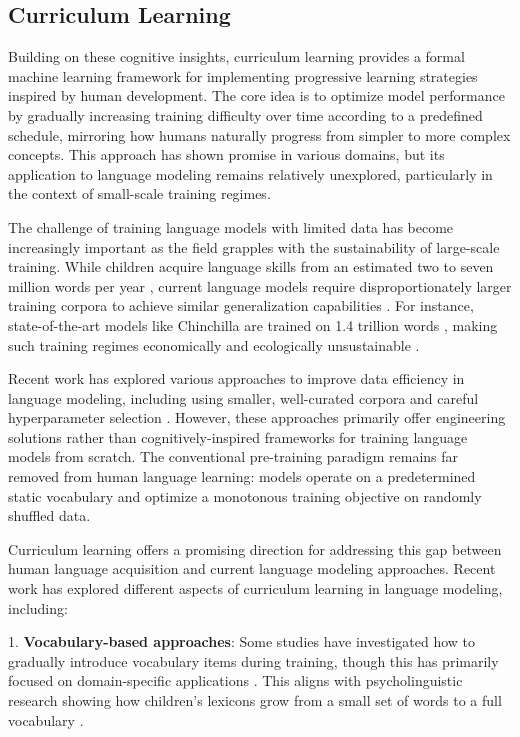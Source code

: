 \subsection{Curriculum Learning}

Building on these cognitive insights, curriculum learning \cite{bengio2009curriculum} provides a formal machine learning framework for implementing progressive learning strategies inspired by human development. The core idea is to optimize model performance by gradually increasing training difficulty over time according to a predefined schedule, mirroring how humans naturally progress from simpler to more complex concepts. This approach has shown promise in various domains, but its application to language modeling remains relatively unexplored, particularly in the context of small-scale training regimes.

The challenge of training language models with limited data has become increasingly important as the field grapples with the sustainability of large-scale training. While children acquire language skills from an estimated two to seven million words per year \cite{gilkerson2017mapping}, current language models require disproportionately larger training corpora to achieve similar generalization capabilities \cite{zhang2021need}. For instance, state-of-the-art models like Chinchilla are trained on 1.4 trillion words \cite{hoffman2022chinchilla}, making such training regimes economically and ecologically unsustainable \cite{izsak2021train}.

Recent work has explored various approaches to improve data efficiency in language modeling, including using smaller, well-curated corpora \cite{samuel2023ltgbert, gao2020pile} and careful hyperparameter selection \cite{geiping2023cramming}. However, these approaches primarily offer engineering solutions rather than cognitively-inspired frameworks for training language models from scratch. The conventional pre-training paradigm remains far removed from human language learning: models operate on a predetermined static vocabulary and optimize a monotonous training objective on randomly shuffled data.

Curriculum learning offers a promising direction for addressing this gap between human language acquisition and current language modeling approaches. Recent work has explored different aspects of curriculum learning in language modeling, including:

1. \textbf{Vocabulary-based approaches}: Some studies have investigated how to gradually introduce vocabulary items during training, though this has primarily focused on domain-specific applications \cite{soviany2022curriculum}. This aligns with psycholinguistic research showing how children's lexicons grow from a small set of words to a full vocabulary \cite{bergelson2015early, weizman2001lexical}.

